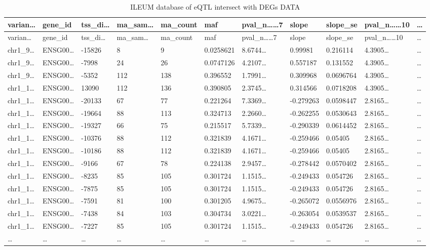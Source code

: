 \documentclass[
]{article}
\begin{document}
\begin{longtable}[]{@{}lllllllllll@{}}
\caption{\label{tab:ILEUM-database-of-eQTL-intersect-with-DEGs-DATA}ILEUM database of eQTL intersect with DEGs DATA}\tabularnewline
\toprule
varian\ldots{} & gene\_id & tss\_di\ldots{} & ma\_sam\ldots{} & ma\_count & maf & pval\_n\ldots\ldots7 & slope & slope\_se & pval\_n\ldots\ldots10 & \ldots{}\tabularnewline
\midrule
\endfirsthead
\toprule
varian\ldots{} & gene\_id & tss\_di\ldots{} & ma\_sam\ldots{} & ma\_count & maf & pval\_n\ldots\ldots7 & slope & slope\_se & pval\_n\ldots\ldots10 & \ldots{}\tabularnewline
\midrule
\endhead
chr1\_9\ldots{} & ENSG00\ldots{} & -15826 & 8 & 9 & 0.0258621 & 8.6744\ldots{} & 0.99981 & 0.216114 & 4.3905\ldots{} & \ldots{}\tabularnewline
chr1\_9\ldots{} & ENSG00\ldots{} & -7998 & 24 & 26 & 0.0747126 & 4.2107\ldots{} & 0.557187 & 0.131552 & 4.3905\ldots{} & \ldots{}\tabularnewline
chr1\_9\ldots{} & ENSG00\ldots{} & -5352 & 112 & 138 & 0.396552 & 1.7991\ldots{} & 0.309968 & 0.0696764 & 4.3905\ldots{} & \ldots{}\tabularnewline
chr1\_1\ldots{} & ENSG00\ldots{} & 13090 & 112 & 136 & 0.390805 & 2.3745\ldots{} & 0.314566 & 0.0718208 & 4.3905\ldots{} & \ldots{}\tabularnewline
chr1\_1\ldots{} & ENSG00\ldots{} & -20133 & 67 & 77 & 0.221264 & 7.3369\ldots{} & -0.279263 & 0.0598447 & 2.8165\ldots{} & \ldots{}\tabularnewline
chr1\_1\ldots{} & ENSG00\ldots{} & -19664 & 88 & 113 & 0.324713 & 2.2660\ldots{} & -0.262255 & 0.0530643 & 2.8165\ldots{} & \ldots{}\tabularnewline
chr1\_1\ldots{} & ENSG00\ldots{} & -19327 & 66 & 75 & 0.215517 & 5.7339\ldots{} & -0.290339 & 0.0614452 & 2.8165\ldots{} & \ldots{}\tabularnewline
chr1\_1\ldots{} & ENSG00\ldots{} & -10376 & 88 & 112 & 0.321839 & 4.1671\ldots{} & -0.259466 & 0.05405 & 2.8165\ldots{} & \ldots{}\tabularnewline
chr1\_1\ldots{} & ENSG00\ldots{} & -10186 & 88 & 112 & 0.321839 & 4.1671\ldots{} & -0.259466 & 0.05405 & 2.8165\ldots{} & \ldots{}\tabularnewline
chr1\_1\ldots{} & ENSG00\ldots{} & -9166 & 67 & 78 & 0.224138 & 2.9457\ldots{} & -0.278442 & 0.0570402 & 2.8165\ldots{} & \ldots{}\tabularnewline
chr1\_1\ldots{} & ENSG00\ldots{} & -8235 & 85 & 105 & 0.301724 & 1.1515\ldots{} & -0.249433 & 0.054726 & 2.8165\ldots{} & \ldots{}\tabularnewline
chr1\_1\ldots{} & ENSG00\ldots{} & -7875 & 85 & 105 & 0.301724 & 1.1515\ldots{} & -0.249433 & 0.054726 & 2.8165\ldots{} & \ldots{}\tabularnewline
chr1\_1\ldots{} & ENSG00\ldots{} & -7591 & 81 & 100 & 0.301205 & 4.9675\ldots{} & -0.265072 & 0.0556976 & 2.8165\ldots{} & \ldots{}\tabularnewline
chr1\_1\ldots{} & ENSG00\ldots{} & -7438 & 84 & 103 & 0.304734 & 3.0221\ldots{} & -0.263054 & 0.0539537 & 2.8165\ldots{} & \ldots{}\tabularnewline
chr1\_1\ldots{} & ENSG00\ldots{} & -7227 & 85 & 105 & 0.301724 & 1.1515\ldots{} & -0.249433 & 0.054726 & 2.8165\ldots{} & \ldots{}\tabularnewline
\ldots{} & \ldots{} & \ldots{} & \ldots{} & \ldots{} & \ldots{} & \ldots{} & \ldots{} & \ldots{} & \ldots{} & \ldots{}\tabularnewline
\bottomrule
\end{longtable}
\end{document}
